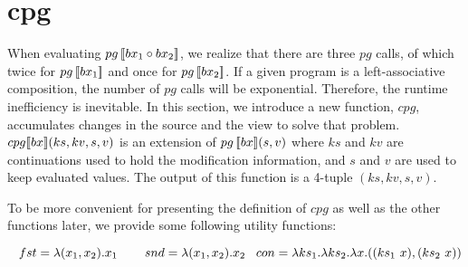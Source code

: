 \section{cpg}

When evaluating $pg \, [\![bx_1 \circ bx_2]\!]$, we realize that there are three $pg$ calls, of which twice for $pg \, [\![bx_1]\!]$ and once for $pg \, [\![bx_2]\!]$. If a given program is a left-associative composition, the number of $pg$ calls will be exponential. Therefore, the runtime inefficiency is inevitable. In this section, we introduce a new function, $cpg$, accumulates changes in the source and the view to solve that problem. $cpg [\![bx]\!] (ks, kv, s, v)$ is an extension of $pg \, [\![bx]\!] (s, v)$ where $ks$ and $kv$ are continuations used to hold the modification information, and $s$ and $v$ are used to keep evaluated values. The output of this function is a 4-tuple $(ks, kv, s, v)$.

To be more convenient for presenting the definition of $cpg$ as well as the other functions later, we provide some following utility functions:

$\tab fst = \lambda (x_1,x_2). x_1 \qtab snd = \lambda (x_1,x_2). x_2\\
 \tab con = \lambda ks_1. \lambda ks_2. \lambda x. ((ks_1 \ x),(ks_2 \ x))$

